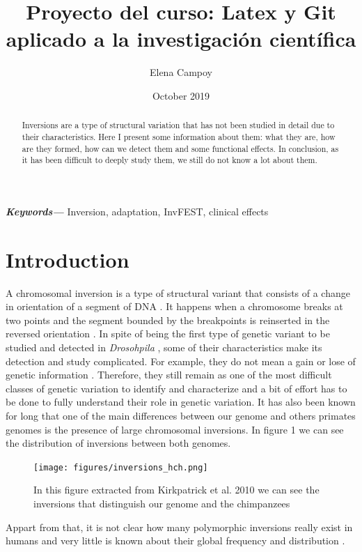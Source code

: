 \documentclass[a4paper,12pt]{article}
\title{Proyecto del curso: Latex y Git aplicado a la investigación científica}
\author{Elena Campoy}
\date{October 2019}
\providecommand{\keywords}[1]
{
  \small	
  \textbf{\textit{Keywords---}} #1
}
\begin{document}
\maketitle

\begin{abstract}
Inversions are a type of structural variation that has not been studied in detail due to their characteristics. Here I present some information about them: what they are, how are they formed, how can we detect them and some functional effects. In conclusion, as it has been difficult to deeply study them, we still do not know a lot about them. 
\end{abstract}

\keywords{Inversion, adaptation, InvFEST, clinical effects}

\section{Introduction}
A chromosomal inversion is a type of structural variant that consists of a change in orientation of a segment of DNA \cite{puig_human_2015, giner-delgado_evolutionary_2019}. It happens when a chromosome breaks at two points and the segment bounded by the breakpoints is reinserted in the reversed orientation \cite{kirkpatrick_how_2010}. In spite of being the first type of genetic variant to be studied and detected in {\em Drosohpila} \cite{kirkpatrick_how_2010}, some of their characteristics make its detection and study complicated. For example, they do not mean a gain or lose of genetic information \cite{giner-delgado_evolutionary_2019}. Therefore, they still remain as one of the most difficult classes of genetic variation to identify and characterize \cite{puig_determining_2019} and a bit of effort has to be done to fully understand their role in genetic variation. It has also been known for long that one of the main differences between our genome and others primates genomes is the presence of large chromosomal inversions. In figure 1 we can see the distribution of inversions between both genomes.
\begin{figure}[!htb]
    \centering
    \texttt{[image: figures/inversions\_hch.png]}
    \caption{In this figure extracted from Kirkpatrick et al. 2010 \cite{kirkpatrick_how_2010} we can see the inversions that distinguish our genome and the chimpanzees }
    \label{fig:invchimpanzees}
\end{figure}
Appart from that, it is not clear how many polymorphic inversions really exist in humans and very little is known about their global frequency and distribution \cite{giner-delgado_evolutionary_2019}.
\end{document}
